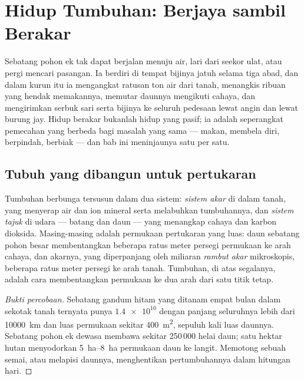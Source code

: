 \chapter{Hidup Tumbuhan: Berjaya sambil Berakar}\label{ch:g12:plant-rooted-life}

Sebatang pohon ek tak dapat berjalan menuju air, lari dari seekor ulat,
atau pergi mencari pasangan. Ia berdiri di tempat bijinya jatuh selama
tiga abad, dan dalam kurun itu ia mengangkat ratusan ton air dari
tanah, menangkis ribuan  yang hendak memakannya, memutar daunnya
mengikuti cahaya, dan mengirimkan serbuk sari serta bijinya ke seluruh
pedesaan lewat angin dan lewat burung jay. Hidup berakar bukanlah hidup
yang pasif; ia adalah seperangkat pemecahan yang berbeda bagi masalah
yang sama --- makan, membela diri, berpindah, berbiak --- dan bab ini
meninjaunya satu per satu.

\section{Tubuh yang dibangun untuk pertukaran}

\begin{proposition}\label{prop:g12:plant-rooted-life:surfaces}
Tumbuhan berbunga tersusun dalam dua sistem: \emph{sistem akar} di
dalam tanah, yang menyerap air dan ion mineral serta melabuhkan
tumbuhannya, dan \emph{sistem tajuk} di udara --- batang dan daun ---
yang menangkap cahaya dan karbon dioksida. Masing-masing adalah
permukaan pertukaran yang luas: daun sebatang pohon besar membentangkan
beberapa ratus meter persegi permukaan ke arah cahaya, dan akarnya,
yang diperpanjang oleh miliaran \emph{rambut akar}
mikroskopis, beberapa ratus meter persegi ke arah tanah. Tumbuhan,
di atas segalanya, adalah cara membentangkan permukaan ke dua arah
dari satu titik tetap.
\end{proposition}
\begin{proof}[Bukti percobaan]
Sebatang gandum hitam yang ditanam empat bulan dalam sekotak tanah
ternyata punya $\num{1.4e10}$  dengan panjang seluruhnya
lebih dari \qty{10000}{km} dan luas permukaan sekitar \qty{400}{m^2},
sepuluh kali luas daunnya. Sebatang pohon ek dewasa membawa sekitar
250\,000 helai daun; satu hektar hutan menyodorkan
\qtyrange{5}{8}{ha} permukaan daun ke langit. Memotong 
sebuah semai, atau melapisi daunnya, menghentikan pertumbuhannya dalam
hitungan hari.
\end{proof}

